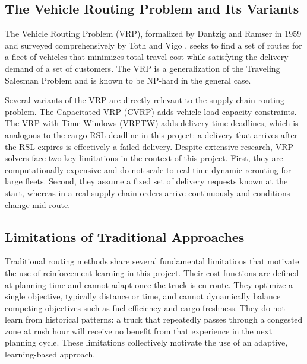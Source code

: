 \subsection{The Vehicle Routing Problem and Its Variants}

The Vehicle Routing Problem (VRP), formalized by Dantzig and Ramser in 1959 and
surveyed comprehensively by Toth and Vigo \cite{toth2002}, seeks to find a set of
routes for a fleet of vehicles that minimizes total travel cost while satisfying
the delivery demand of a set of customers. The VRP is a generalization of the
Traveling Salesman Problem and is known to be NP-hard in the general case.

Several variants of the VRP are directly relevant to the supply chain routing
problem. The Capacitated VRP (CVRP) adds vehicle load capacity constraints. The
VRP with Time Windows (VRPTW) adds delivery time deadlines, which is analogous
to the cargo RSL deadline in this project: a delivery that arrives after the RSL
expires is effectively a failed delivery. Despite extensive research, VRP solvers
face two key limitations in the context of this project. First, they are
computationally expensive and do not scale to real-time dynamic rerouting for
large fleets. Second, they assume a fixed set of delivery requests known at the
start, whereas in a real supply chain orders arrive continuously and conditions
change mid-route.

\subsection{Limitations of Traditional Approaches}

Traditional routing methods share several fundamental limitations that motivate
the use of reinforcement learning in this project. Their cost functions are
defined at planning time and cannot adapt once the truck is en route. They
optimize a single objective, typically distance or time, and cannot dynamically
balance competing objectives such as fuel efficiency and cargo freshness. They do
not learn from historical patterns: a truck that repeatedly passes through a
congested zone at rush hour will receive no benefit from that experience in the
next planning cycle. These limitations collectively motivate the use of an
adaptive, learning-based approach.

